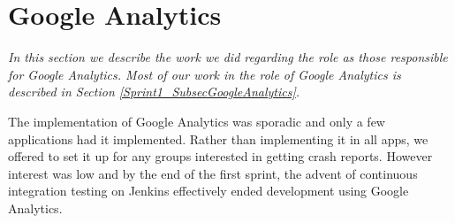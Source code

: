 \section{Google Analytics} \label{Roles_SecAnalytics}
\textit{In this section we describe  the work we did regarding the role as those responsible for Google Analytics. Most of our work in the role of Google Analytics is described in Section \ref{Sprint1_SubsecGoogleAnalytics}.}

The implementation of Google Analytics was sporadic and only a few applications had it implemented. Rather than implementing it in all apps, we offered to set it up for any groups interested in getting crash reports. However interest was low and by the end of the first sprint, the advent of continuous integration testing on Jenkins effectively ended development using Google Analytics.
\newpage